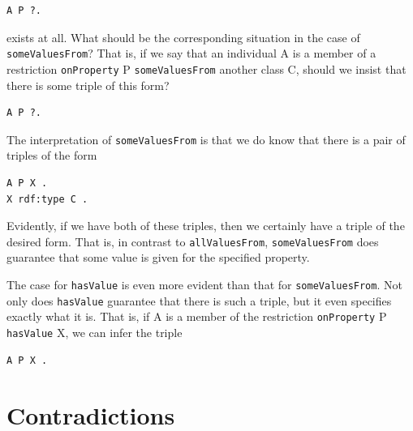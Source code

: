 \begin{lstlisting}
A P ?.
\end{lstlisting}

exists at all. What should be the corresponding situation in the case of
\texttt{someValuesFrom}? That is, if we say that an individual A is a member of a
restriction \texttt{onProperty} P \texttt{someValuesFrom} another class C, should we
insist that there is some triple of this form?

\begin{lstlisting}
A P ?.
\end{lstlisting}

The interpretation of \texttt{someValuesFrom} is that we do know that there is a
pair of triples of the form

\begin{lstlisting}
A P X .
X rdf:type C .
\end{lstlisting}

Evidently, if we have both of these triples, then we certainly have a
triple of the desired form. That is, in contrast to \texttt{allValuesFrom},
\texttt{someValuesFrom} does guarantee that some value is given for the specified
property.

The case for \texttt{hasValue} is even more evident than that for \texttt{someValuesFrom}.
Not only does \texttt{hasValue} guarantee that there is such a triple, but it
even specifies exactly what it is. That is, if A is a member of the
restriction \texttt{onProperty} P \texttt{hasValue} X, we can infer the triple

\begin{lstlisting}
A P X .
\end{lstlisting}

\section{Contradictions}

